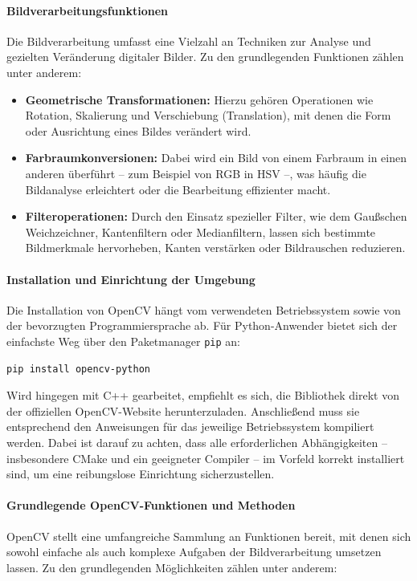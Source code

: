 \paragraph{Bildverarbeitungsfunktionen}
Die Bildverarbeitung umfasst eine Vielzahl an Techniken zur Analyse und gezielten Veränderung digitaler Bilder. Zu den grundlegenden Funktionen zählen unter anderem:

\begin{itemize}
    \item \textbf{Geometrische Transformationen:} Hierzu gehören Operationen wie Rotation, Skalierung und Verschiebung (Translation), mit denen die Form oder Ausrichtung eines Bildes verändert wird.
    \item \textbf{Farbraumkonversionen:} Dabei wird ein Bild von einem Farbraum in einen anderen überführt – zum Beispiel von RGB in HSV –, was häufig die Bildanalyse erleichtert oder die Bearbeitung effizienter macht.
    \item \textbf{Filteroperationen:} Durch den Einsatz spezieller Filter, wie dem Gaußschen Weichzeichner, Kantenfiltern oder Medianfiltern, lassen sich bestimmte Bildmerkmale hervorheben, Kanten verstärken oder Bildrauschen reduzieren.
\end{itemize}

\paragraph{Installation und Einrichtung der Umgebung}
Die Installation von OpenCV hängt vom verwendeten Betriebssystem sowie von der bevorzugten Programmiersprache ab. Für Python-Anwender bietet sich der einfachste Weg über den Paketmanager \texttt{pip} an:

\begin{verbatim}
pip install opencv-python
\end{verbatim}

Wird hingegen mit C++ gearbeitet, empfiehlt es sich, die Bibliothek direkt von der offiziellen OpenCV-Website herunterzuladen. Anschließend muss sie entsprechend den Anweisungen für das jeweilige Betriebssystem kompiliert werden. Dabei ist darauf zu achten, dass alle erforderlichen Abhängigkeiten – insbesondere CMake und ein geeigneter Compiler – im Vorfeld korrekt installiert sind, um eine reibungslose Einrichtung sicherzustellen.

\paragraph{Grundlegende OpenCV-Funktionen und Methoden}
OpenCV stellt eine umfangreiche Sammlung an Funktionen bereit, mit denen sich sowohl einfache als auch komplexe Aufgaben der Bildverarbeitung umsetzen lassen. Zu den grundlegenden Möglichkeiten zählen unter anderem:

